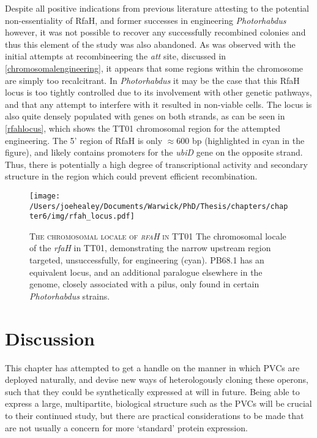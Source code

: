 Despite all positive indications from previous literature attesting to the potential non-essentiality of RfaH, and former successes in engineering \emph{Photorhabdus} however, it was not possible to recover any successfully recombined colonies and thus this element of the study was also abandoned. As was observed with the initial attempts at recombineering the \emph{att} site, discussed in \vref{chromosomalengineering}, it appears that some regions within the chromosome are simply too recalcitrant. In \emph{Photorhabdus} it may be the case that this RfaH locus is too tightly controlled due to its involvement with other genetic pathways, and that any attempt to interfere with it resulted in non-viable cells. The locus is also quite densely populated with genes on both strands, as can be seen in \vref{rfahlocus}, which shows the \Plum{} TT01 chromosomal region for the attempted engineering. The 5' region of RfaH is only $\approx$600 bp (highlighted in cyan in the figure), and likely contains promoters for the \emph{ubiD} gene on the opposite strand. Thus, there is potentially a high degree of transcriptional activity and secondary structure in the region which could prevent efficient recombination.

\begin{figure}[h!]
    \texttt{[image: /Users/joehealey/Documents/Warwick/PhD/Thesis/chapters/chapter6/img/rfah\_locus.pdf]}
    \captionsetup{singlelinecheck=off, justification=justified, font=footnotesize, aboveskip=5pt}
    \caption[RfaH locale in \Plum{} TT01]{\textsc{\normalsize The chromosomal locale of \emph{rfaH} in \Plum{} TT01} \vspace{0.1cm} \newline The chromosomal locale of the \emph{rfaH} in \Plum{} TT01, demonstrating the narrow upstream region targeted, unsuccessfully, for engineering (cyan). \Pasy{} PB68.1 has an equivalent locus, and an additional paralogue elsewhere in the genome, closely associated with a pilus, only found in certain \emph{Photorhabdus} strains.}
\label{rfahlocus}
\end{figure}

\clearpage
\section{Discussion}

This chapter has attempted to get a handle on the manner in which PVCs are deployed naturally, and devise new ways of heterologously cloning these operons, such that they could be synthetically expressed at will in future. Being able to express a large, multipartite, biological structure such as the PVCs will be crucial to their continued study, but there are practical considerations to be made that are not usually a concern for more `standard' protein expression.

